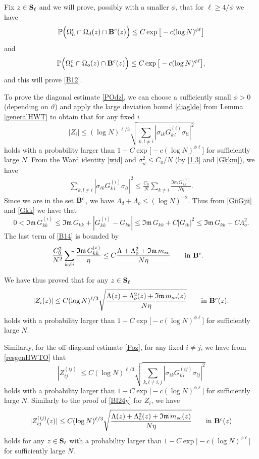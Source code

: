 \documentclass[draft]{article}
\newcommand{\ttau}{\vartheta}
\newcommand{\be}{\begin{equation}}
\newcommand{\ee}{\end{equation}}
\newcommand{\im}{{\mathfrak{Im} \, }}
\renewcommand{\P}{{\mathbb P}}
\newcommand{\bS}{ {\bf  S}}
\numberwithin{equation}{section}
\numberwithin{theorem}{section}
\numberwithin{definition}{section}
\numberwithin{remark}{section}
\begin{document}
Fix $z\in \bS_\ell$ and we
will prove, possibly with a smaller $\phi$, that for $\ell \ge 4/\phi$ we have
\be\label{POdz}
\P\Big(\Omega_h^c\cap  \Omega_d(z) \cap {\bf B}^c(z) \Big)\leq
 C\exp{\big[-c(\log N)^{\phi \ell } \big]}
\ee
and
\be\label{Poz}
\P\Big(\Omega_h^c\cap\Omega_o(z)\cap {\bf B}^c(z) \Big)\leq 
C\exp{\big[-c(\log N)^{\phi \ell }\big]},
\ee
and this will prove \eqref{B12}.



To prove the diagonal estimate \eqref{POdz}, we can choose 
a sufficiently small $\phi>0$
(depending on $\ttau$) and 
apply the large deviation bound \eqref{diaglde} from 
Lemma \ref{generalHWT} to obtain that 
for any fixed $i$
 \be\label{BI23}
|Z_{i}|
 \leq  (\log N)^{\ell/3} \sqrt{\sum_{k,l\not= i }\left|\sigma_{ik}
G^{(i)}_{k\,l}\sigma_{li}\right|^2}
\ee
holds with a probability larger than $1- C\exp{\big[-c(\log N)^{\phi \ell } \big]}$ 
for sufficiently large $N$.
{F}rom the Ward identity \eqref{wid} and $\sigma_{il}^2 \le C_0/ N$  (by \eqref{1.3} and \eqref{Gkkm}), 
we have 
\begin{align} \label{B14}
\sum_{k, l\not= i }\left|\sigma_{ik}
G^{(i)}_{k\,l}\sigma_{li}\right|^2 
\le 
\frac{C_0}{ N} \sum_{k\not= i } \frac{\im G^{(i\,)}_{kk}}{N \eta}.
\end{align}
Since we are in the set ${\bf B}^c$, we have $ \Lambda_d + \Lambda_o
\le (\log N)^{-2}$. Thus from \eqref{GiiGjii} and \eqref{Gkk} we have  that
\be\label{5}
 0 <   \im G_{kk}^{(i)} \le  \im G_{kk}+ |G_{kk}^{(i)} - G_{kk}|\le 
\im G_{kk} +C   |G_{ik}|^2 \le  \im G_{kk} + C \Lambda_o^2.
\ee
The last term of \eqref{B14} is bounded by 
\begin{align} \label{B14y}
\frac {C_0^2} { N^2 }\sum_{k\not= i } \frac{\im G^{(i\,)}_{kk}}{\eta}
& \le C 
\frac{ \Lambda+ \Lambda_o^2  +  {\im m_{sc} }}{N \eta} 
\qquad \mbox{in ${\bf B}^c$}.
\end{align}

We have thus proved that for any $z\in {\bf S}_\ell$
 \be\label{BI24y}
|Z_{i}(z)|
 \leq C(\log N)^{\ell/3}  \sqrt{\frac{ \Lambda (z)+ \Lambda_o^2(z)  +  {\im m_{sc}(z) }}{N \eta}  }
 \qquad \mbox{in ${\bf B}^c(z)$}.
\ee
holds with a probability larger than $1- C\exp{\big[-c(\log N)^{\phi \ell } \big]}$ for sufficiently large $N$.



Similarly, for the off-diagonal estimate \eqref{Poz}, for any fixed   $i\ne j$,
 we have from \eqref{resgenHWTO} that 
 \be\label{BI244}
|Z_{ij}^{(ij)}|
 \leq   C(\log N)^{\ell/3}  \sqrt{\sum_{k,l\not= i, j }\left|\sigma_{ik}
G^{(ij)}_{k\,l}\sigma_{lj}\right|^2}
\ee
holds with a probability larger than  $1- C\exp{\big[-c(\log N)^{\phi \ell } \big]}$
 for sufficiently large $N$.
Similarly to the proof of \eqref{BI24y} for $Z_i$, we have 
 \be\label{BI244y}
|Z_{ij}^{(ij)}(z)|
 \leq  C(\log N)^{\ell/3}    \sqrt{\frac{ \Lambda(z)+ \Lambda_o^2(z)  +  {\im m_{sc}(z) }}{N \eta}  }
 \qquad \mbox{in ${\bf B}^c(z)$}
\ee
holds for any $z\in {\bf S}_\ell$
with a probability larger than $1- C\exp{\big[-c(\log N)^{\phi \ell } \big]}$ for sufficiently large $N$.
\end{document}
